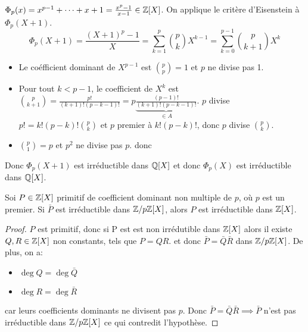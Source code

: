 \begin{example}
	$\Phi_p(x) = x^{p-1} + \cdots + x + 1  = \frac{x^p - 1}{x-1} \in \mathbb{Z}[X]$.
	On applique le critère d'Eisenstein à $\Phi_p(X+1)$.
	$$ \Phi_p(X+1) = \frac{(X+1)^p - 1}{X} = \sum_{k=1}^p \binom{p}{k} X^{k-1} = \sum_{k=0}^{p-1} \binom{p}{k+1} X^k$$
	\begin{itemize}
		\item Le coéfficient dominant de $X^{p-1}$ est $\binom{p}{p} = 1$ et $p$ ne divise pas 1.
		\item Pour tout $k < p-1$, le coefficient de $X^k$ est $\binom{p}{k+1} = \frac{p!}{(k+1)!(p-k-1)!} = p \underbrace{\frac{(p-1)!}{(k+1)!(p-k-1)!}}_{\in A}$.
		      $p$ divise $p! = k!(p-k)!\binom{p}{k}$ et $p$ premier à $k!(p-k)!$, donc $p$ divise $\binom{p}{k}$.
		\item $\binom{p}{1} = p$ et $p^2$ ne divise pas $p$. donc
	\end{itemize}
	Donc $\Phi_p(X+1)$ est irréductible dans $\mathbb{Q}[X]$ et donc $\Phi_p(X)$ est irréductible dans $\mathbb{Q}[X]$.
\end{example}


\begin{prop}
	Soi $P \in \mathbb{Z}[X]$ primitif de coefficient dominant non multiple de $p$, où $p$ est un premier.
	Si $\bar{P}$ est irréductible dans  $\mathbb{Z}/p\mathbb{Z}[X]$, alors $P$ est irréductible dans $\mathbb{Z}[X]$.
\end{prop}

\begin{proof}
    $P$ est primitif, donc si P est est non irrédutible dans $\mathbb{Z}[X]$ alors il existe $Q, R \in \mathbb{Z}[X]$ non constants, tels que $P = QR$.
	et donc $\bar{P} = \bar{Q}\bar{R}$ dans $\mathbb{Z}/p\mathbb{Z}[X]$.
	De plus, on a:
	\begin{itemize}
		\item $\deg Q = \deg \bar{Q}$
		\item $\deg R = \deg \bar{R}$

	\end{itemize}
	car leurs coefficients dominants ne divisent pas $p$.
	Donc $\bar{P} = \bar{Q}\bar{R} \implies \bar{P}$ n'est pas irréductible dans $\mathbb{Z}/p\mathbb{Z}[X]$ ce qui contredit l'hypothèse.
\end{proof}

